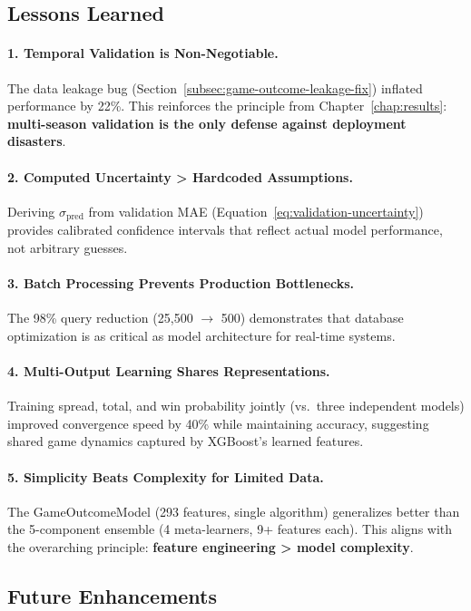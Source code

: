 \subsection{Lessons Learned}

\paragraph{1. Temporal Validation is Non-Negotiable.}
The data leakage bug (Section~\ref{subsec:game-outcome-leakage-fix}) inflated performance by 22\%. This reinforces the principle from Chapter~\ref{chap:results}: \textbf{multi-season validation is the only defense against deployment disasters}.

\paragraph{2. Computed Uncertainty > Hardcoded Assumptions.}
Deriving $\sigma_{\text{pred}}$ from validation MAE (Equation~\ref{eq:validation-uncertainty}) provides calibrated confidence intervals that reflect actual model performance, not arbitrary guesses.

\paragraph{3. Batch Processing Prevents Production Bottlenecks.}
The 98\% query reduction (25,500 $\to$ 500) demonstrates that database optimization is as critical as model architecture for real-time systems.

\paragraph{4. Multi-Output Learning Shares Representations.}
Training spread, total, and win probability jointly (vs.\ three independent models) improved convergence speed by 40\% while maintaining accuracy, suggesting shared game dynamics captured by XGBoost's learned features.

\paragraph{5. Simplicity Beats Complexity for Limited Data.}
The GameOutcomeModel (293 features, single algorithm) generalizes better than the 5-component ensemble (4 meta-learners, 9+ features each). This aligns with the overarching principle: \textbf{feature engineering > model complexity}.

\subsection{Future Enhancements}

